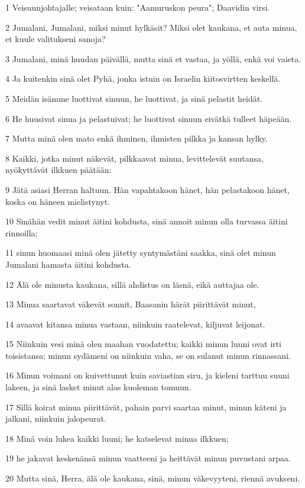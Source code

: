 \par 1 Veisuunjohtajalle; veisataan kuin: "Aamuruskon peura"; Daavidin virsi.
\par 2 Jumalani, Jumalani, miksi minut hylkäsit? Miksi olet kaukana, et auta minua, et kuule valitukseni sanoja?
\par 3 Jumalani, minä huudan päivällä, mutta sinä et vastaa, ja yöllä, enkä voi vaieta.
\par 4 Ja kuitenkin sinä olet Pyhä, jonka istuin on Israelin kiitosvirtten keskellä.
\par 5 Meidän isämme luottivat sinuun, he luottivat, ja sinä pelastit heidät.
\par 6 He huusivat sinua ja pelastuivat; he luottivat sinuun eivätkä tulleet häpeään.
\par 7 Mutta minä olen mato enkä ihminen, ihmisten pilkka ja kansan hylky.
\par 8 Kaikki, jotka minut näkevät, pilkkaavat minua, levittelevät suutansa, nyökyttävät ilkkuen päätään:
\par 9 Jätä asiasi Herran haltuun. Hän vapahtakoon hänet, hän pelastakoon hänet, koska on häneen mielistynyt.
\par 10 Sinähän vedit minut äitini kohdusta, sinä annoit minun olla turvassa äitini rinnoilla;
\par 11 sinun huomaasi minä olen jätetty syntymästäni saakka, sinä olet minun Jumalani hamasta äitini kohdusta.
\par 12 Älä ole minusta kaukana, sillä ahdistus on läsnä, eikä auttajaa ole.
\par 13 Minua saartavat väkevät sonnit, Baasanin härät piirittävät minut,
\par 14 avaavat kitansa minua vastaan, niinkuin raatelevat, kiljuvat leijonat.
\par 15 Niinkuin vesi minä olen maahan vuodatettu; kaikki minun luuni ovat irti toisistansa; minun sydämeni on niinkuin vaha, se on sulanut minun rinnassani.
\par 16 Minun voimani on kuivettunut kuin saviastian siru, ja kieleni tarttuu suuni lakeen, ja sinä lasket minut alas kuoleman tomuun.
\par 17 Sillä koirat minua piirittävät, pahain parvi saartaa minut, minun käteni ja jalkani, niinkuin jalopeurat.
\par 18 Minä voin lukea kaikki luuni; he katselevat minua ilkkuen;
\par 19 he jakavat keskenänsä minun vaatteeni ja heittävät minun puvustani arpaa.
\par 20 Mutta sinä, Herra, älä ole kaukana, sinä, minun väkevyyteni, riennä avukseni.

